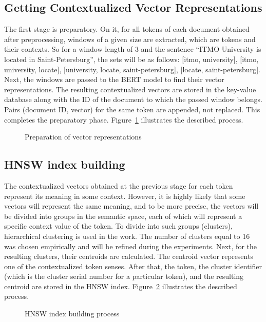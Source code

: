 \documentclass[
    twocolumn,
]{template/ceurart}
\begin{document}
    \subsection{Getting Contextualized Vector Representations}
    The first stage is preparatory.
    On it, for all tokens of each document obtained after preprocessing,
    windows of a given size are extracted, which are tokens and their contexts.
    So for a window length of 3 and the sentence ``ITMO University is located in Saint-Petersburg'',
    the sets will be as follows: [itmo, university], [itmo, university, locate],
    [university, locate, saint-petersburg], [locate, saint-petersburg].
    Next, the windows are passed to the BERT model to find their vector representations.
    The resulting contextualized vectors are stored in the key-value database
    along with the ID of the document to which the passed window belongs.
    Pairs (document ID, vector) for the same token are appended, not replaced.
    This completes the preparatory phase.
    Figure~\ref{fig:storeVectors} illustrates the described process.
    \begin{figure}
        \centering
        
        \caption{Preparation of vector representations}
        \label{fig:storeVectors}
    \end{figure}
    
    \subsection{HNSW index building}
    The contextualized vectors obtained at the previous stage for each token represent its meaning in some context.
    However, it is highly likely that some vectors will represent the same meaning, and to be more precise,
    the vectors will be divided into groups in the semantic space,
    each of which will represent a specific context value of the token.
    To divide into such groups (clusters), hierarchical clustering is used in the work.
    The number of clusters equal to 16 was chosen empirically and will be refined during the experiments.
    Next, for the resulting clusters, their centroids are calculated.
    The centroid vector represents one of the contextualized token senses.
    After that, the token, the cluster identifier (which is the cluster serial number for a particular token),
    and the resulting centroid are stored in the HNSW index.
    Figure~\ref{fig:hnswIndexBuilding} illustrates the described process.
    \begin{figure}
        \centering
        
        \caption{HNSW index building process}
        \label{fig:hnswIndexBuilding}
    \end{figure}

    
\end{document}
